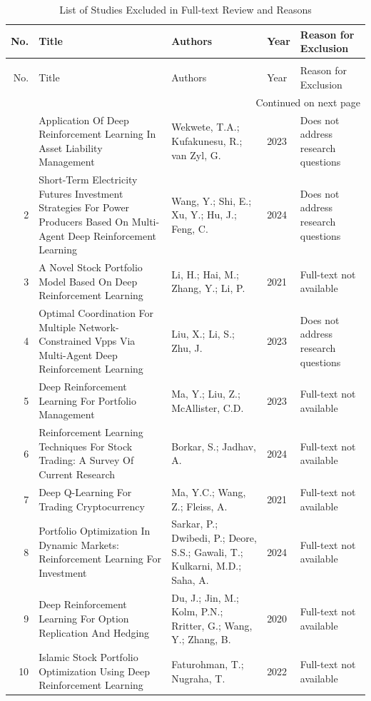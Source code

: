 \begin{small}
\begin{longtable}{r p{5cm} p{4cm} p{1cm} p{5cm}}
\caption{List of Studies Excluded in Full-text Review and Reasons} \\
\toprule
No. & Title & Authors & Year & Reason for Exclusion \\
\midrule
\endfirsthead
\caption[]{List of Studies Excluded in Full-text Review and Reasons} \\
\toprule
No. & Title & Authors & Year & Reason for Exclusion \\
\midrule
\endhead
\midrule
\multicolumn{5}{r}{Continued on next page} \\
\midrule
\endfoot
\bottomrule
\endlastfoot
1 & Application Of Deep Reinforcement Learning In Asset Liability Management & Wekwete, T.A.; Kufakunesu, R.; van Zyl, G. & 2023 & Does not address research questions \\
2 & Short-Term Electricity Futures Investment Strategies For Power Producers Based On Multi-Agent Deep Reinforcement Learning & Wang, Y.; Shi, E.; Xu, Y.; Hu, J.; Feng, C. & 2024 & Does not address research questions \\
3 & A Novel Stock Portfolio Model Based On Deep Reinforcement Learning & Li, H.; Hai, M.; Zhang, Y.; Li, P. & 2021 & Full-text not available \\
4 & Optimal Coordination For Multiple Network-Constrained Vpps Via Multi-Agent Deep Reinforcement Learning & Liu, X.; Li, S.; Zhu, J. & 2023 & Does not address research questions \\
5 & Deep Reinforcement Learning For Portfolio Management & Ma, Y.; Liu, Z.; McAllister, C.D. & 2023 & Full-text not available \\
6 & Reinforcement Learning Techniques For Stock Trading: A Survey Of Current Research & Borkar, S.; Jadhav, A. & 2024 & Full-text not available \\
7 & Deep Q-Learning For Trading Cryptocurrency & Ma, Y.C.; Wang, Z.; Fleiss, A. & 2021 & Full-text not available \\
8 & Portfolio Optimization In Dynamic Markets: Reinforcement Learning For Investment & Sarkar, P.; Dwibedi, P.; Deore, S.S.; Gawali, T.; Kulkarni, M.D.; Saha, A. & 2024 & Full-text not available \\
9 & Deep Reinforcement Learning For Option Replication And Hedging & Du, J.; Jin, M.; Kolm, P.N.; Rritter, G.; Wang, Y.; Zhang, B. & 2020 & Full-text not available \\
10 & Islamic Stock Portfolio Optimization Using Deep Reinforcement Learning & Faturohman, T.; Nugraha, T. & 2022 & Full-text not available \\

\end{longtable}
\end{small}
